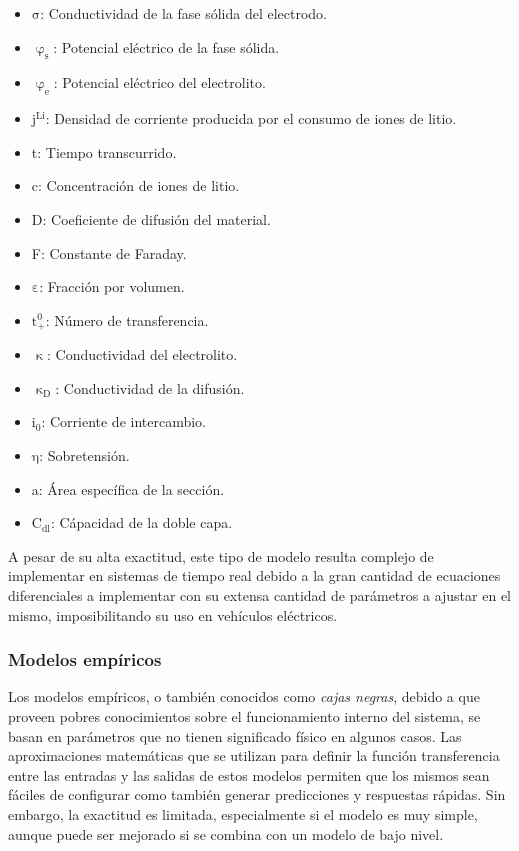 \documentclass[10pt,a4paper]{article}
\begin{document}
\begin{itemize}
    \item $\mathrm{\sigma}$: Conductividad de la fase s\'olida del
        electrodo.
    \item $\mathrm{\upvarphi_s}$: Potencial el\'ectrico de la fase
        s\'olida.
    \item $\mathrm{\upvarphi_e}$: Potencial el\'ectrico del
        electrolito.
    \item $\mathrm{j^{Li}}$: Densidad de corriente producida por el
        consumo de iones de litio.
    \item t: Tiempo transcurrido.
    \item c: Concentraci\'on de iones de litio.
    \item D: Coeficiente de difusi\'on del material.
    \item F: Constante de Faraday.
    \item $\mathrm{\varepsilon}$: Fracci\'on por volumen.
    \item $\mathrm{t_+^0}$: N\'umero de transferencia.
    \item $\mathrm{\upkappa}$: Conductividad del electrolito.
    \item $\mathrm{\upkappa_D}$: Conductividad de la difusi\'on.
    \item $\mathrm{i_0}$: Corriente de intercambio.
    \item $\mathrm{\eta}$: Sobretensi\'on.
    \item a: \'Area espec\'ifica de la secci\'on.
    \item $\mathrm{C_{dl}}$: C\'apacidad de la doble capa.
\end{itemize}

A pesar de su alta exactitud, este tipo de modelo resulta complejo de
implementar en sistemas de tiempo real debido a la gran cantidad de ecuaciones
diferenciales a implementar con su extensa cantidad de par\'ametros a ajustar en
el mismo, imposibilitando su uso en veh\'iculos el\'ectricos.

\subsubsection{Modelos emp\'iricos}\label{empModels}

\noindent Los modelos emp\'iricos, o tambi\'en conocidos como 
\emph{cajas negras}, debido a que proveen pobres conocimientos sobre el 
funcionamiento interno del sistema, se basan en par\'ametros que no tienen 
significado f\'isico en algunos casos. Las aproximaciones matem\'aticas que se 
utilizan para definir la funci\'on transferencia entre las entradas y las 
salidas de estos modelos permiten que los mismos sean f\'aciles de configurar 
como tambi\'en generar predicciones y respuestas r\'apidas. Sin embargo, la 
exactitud es limitada, especialmente si el modelo es muy simple, aunque puede 
ser mejorado si se combina con un modelo de bajo nivel.
\end{document}
